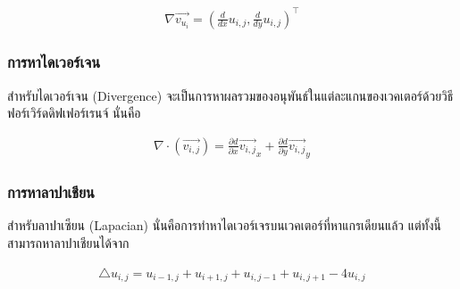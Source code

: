 \begin{align*}
	\nabla \vec{v_{u_i}} = (\frac{d}{dx} u_{i,j},\frac{d}{dy} u_{i,j})^{\top}	
\end{align*}

\subsubsection{การหาไดเวอร์เจน}
\noindent\hspace{1cm}สำหรับไดเวอร์เจน (Divergence) จะเป็นการหาผลรวมของอนุพันธ์ในแต่ละแกนของเวคเตอร์ด้วยวิธีฟอร์เวิร์ดดิฟเฟอร์เรนจ์ นั่นคือ 

\begin{align*} 
	\nabla \cdot (\vec{v_{i,j}}) = \frac{\partial d}{\partial x}\vec{v_{i,j}}_x + \frac{\partial d}{\partial y}\vec{v_{i,j}}_y
\end{align*}

\subsubsection{การหาลาปาเชียน}
\noindent\hspace{1cm}สำหรับลาปาเซียน (Lapacian) นั่นคือการทำหาไดเวอร์เจรบนเวคเตอร์ที่หาแกรเดียนแล้ว แต่ทั้งนี้สามารถหาลาปาเชียนได้จาก

\begin{align*}
	\triangle u_{i,j} = u_{i-1,j} + u_{i+1,j} + u_{i,j-1} + u_{i,j+1} - 4 u_{i,j} 
\end{align*}